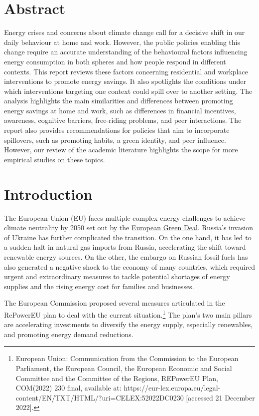 \documentclass[
  11pt,
  captions=heading]{scrreport}
\begin{document}
\clearpage

\hypertarget{abstract}{%
\chapter*{Abstract}\label{abstract}}

Energy crises and concerns about climate change call for a decisive
shift in our daily behaviour at home and work. However, the public
policies enabling this change require an accurate understanding of the
behavioural factors influencing energy consumption in both spheres and
how people respond in different contexts. This report reviews these
factors concerning residential and workplace interventions to promote
energy savings. It also spotlights the conditions under which
interventions targeting one context could spill over to another setting.
The analysis highlights the main similarities and differences between
promoting energy savings at home and work, such as differences in
financial incentives, awareness, cognitive barriers, free-riding
problems, and peer interactions. The report also provides
recommendations for policies that aim to incorporate spillovers, such as
promoting habits, a green identity, and peer influence. However, our
review of the academic literature highlights the scope for more
empirical studies on these topics.

\hypertarget{introduction}{%
\chapter{Introduction}\label{introduction}}

The European Union (EU) faces multiple complex energy challenges to
achieve climate neutrality by 2050 set out by the \href{}{European Green
Deal}. Russia's invasion of Ukraine has further complicated the
transition. On the one hand, it has led to a sudden halt in natural gas
imports from Russia, accelerating the shift toward renewable energy
sources. On the other, the embargo on Russian fossil fuels has also
generated a negative shock to the economy of many countries, which
required urgent and extraordinary measures to tackle potential shortages
of energy supplies and the rising energy cost for families and
businesses.

The European Commission proposed several measures articulated in the
RePowerEU plan to deal with the current situation.\footnote{European
  Union: Communication from the Commission to the European Parliament,
  the European Council, the European Economic and Social Committee and
  the Committee of the Regions, REPowerEU Plan, COM(2022) 230 final,
  available at:
  https://eur-lex.europa.eu/legal-content/EN/TXT/HTML/?uri=CELEX:52022DC0230
  {[}accessed 21 December 2022{]}.} The plan's two main pillars are
accelerating investments to diversify the energy supply, especially
renewables, and promoting energy demand reductions.
\end{document}
